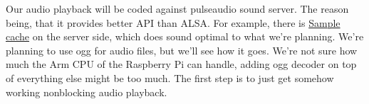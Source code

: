 \documentclass[english,11pt,twoside,a4paper]{article}
\begin{document}
Our audio playback will be coded against pulseaudio sound server. The reason being, that it provides better API than ALSA. For example, there is \href{http://freedesktop.org/software/pulseaudio/doxygen/scache.html}{Sample cache} on the server side, which does sound optimal to what we're planning. We're planning to use ogg for audio files, but we'll see how it goes. We're not sure how much the Arm CPU of the Raspberry Pi can handle, adding ogg decoder on top of everything else might be too much. The first step is to just get somehow working nonblocking audio playback.
\end{document}
